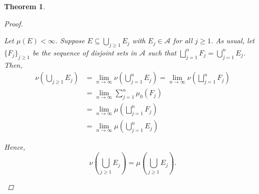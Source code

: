 \documentclass{article}
\newcommand{\A}{\mathscr{A}}
\theoremstyle{spaced}
\newtheorem{theorem}{Theorem}[section]
\begin{document}
\begin{theorem}
\begin{proof}
\begin{enumerate}
            Let $\mu(E) < \infty$. Suppose $E \subseteq \bigcup_{j \geq 1} E_j$ with $E_j \in \A$ for all $j \geq 1$. As usual, let $\{F_j\}_{j \geq 1}$ be the sequence of disjoint sets in $\A$ such that $\bigsqcup_{j = 1}^n F_j = \bigcup_{j = 1}^n E_j$. Then, 
            \begin{align*}
                \nu\left( \bigcup_{j \geq 1} E_j \right) &= \lim_{n \to \infty} \nu \left( \bigcup_{j = 1}^n E_j\right) = \lim_{n \to \infty} \nu \left( \bigsqcup_{j = 1}^n F_j\right) \\
                &= \lim_{n \to \infty} \sum_{j = 1}^{n} \mu_0(F_j) \\
                &= \lim_{n \to \infty} \mu \left( \bigsqcup_{j = 1}^n F_j\right) \tag{as $\mu$ is also an extension of $\mu_0$} \\
                &= \lim_{n \to \infty} \mu \left( \bigcup_{j = 1}^n E_j\right)
            \end{align*}

            Hence, 
            \begin{equation}
                \nu\left( \bigcup_{j \geq 1} E_j \right) = \mu\left( \bigcup_{j \geq 1} E_j \right).
            \end{equation}            
            

\end{enumerate}
\end{proof}
\end{theorem}
\end{document}

